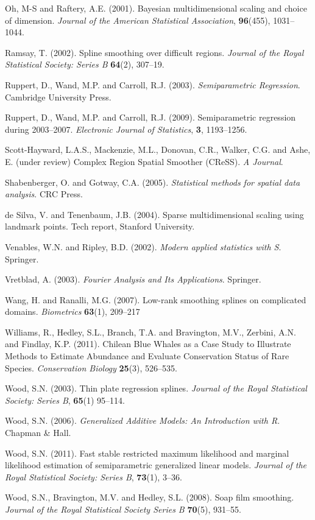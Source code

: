 \documentclass[useAMS, referee]{biom}
\begin{document}
\begin{thebibliography}{99}
\bibitem{} Oh, M-S and Raftery, A.E. (2001). Bayesian multidimensional scaling and choice of dimension. \textit{Journal of the American Statistical Association}, \textbf{96}(455), 1031--1044.

\bibitem{} Ramsay, T. (2002). Spline smoothing over difficult regions. \textit{Journal of the Royal Statistical Society: Series B} \textbf{64}(2), 307--19.

\bibitem{} Ruppert, D., Wand, M.P. and Carroll, R.J. (2003). \textit{Semiparametric Regression}. Cambridge University Press.

\bibitem{} Ruppert, D., Wand, M.P. and Carroll, R.J. (2009). Semiparametric regression during 2003--2007. \textit{Electronic Journal of Statistics}, \textbf{3}, 1193--1256.

\bibitem{} Scott-Hayward, L.A.S., Mackenzie, M.L., Donovan, C.R., Walker, C.G. and Ashe, E. (under review) Complex Region Spatial Smoother (CReSS). \textit{A Journal}.

\bibitem{} Shabenberger, O. and Gotway, C.A. (2005). \textit{Statistical methods for spatial data analysis}. CRC Press.

\bibitem{} de Silva, V. and Tenenbaum, J.B. (2004). Sparse multidimensional scaling using landmark points. Tech report, Stanford University.

\bibitem{} Venables, W.N. and Ripley, B.D. (2002). \textit{Modern applied statistics with S}. Springer.

\bibitem{} Vretblad, A. (2003). \textit{Fourier Analysis and Its Applications}. Springer.

\bibitem{} Wang, H. and Ranalli, M.G. (2007). Low-rank smoothing splines on complicated domains. \textit{Biometrics} \textbf{63}(1), 209--217

\bibitem{} Williams, R., Hedley, S.L., Branch, T.A. and Bravington, M.V., Zerbini, A.N. and Findlay, K.P. (2011). Chilean Blue Whales as a Case Study to Illustrate Methods to Estimate Abundance and Evaluate Conservation Status of Rare Species. \textit{Conservation Biology} \textbf{25}(3), 526--535.

\bibitem{} Wood, S.N. (2003). Thin plate regression splines. \textit{Journal of the Royal Statistical Society: Series B}, \textbf{65}(1) 95--114.

\bibitem{} Wood, S.N. (2006). \textit{Generalized Additive Models: An Introduction with R}. Chapman \& Hall.

\bibitem{} Wood, S.N. (2011). Fast stable restricted maximum likelihood and marginal likelihood estimation of semiparametric generalized linear models. \textit{Journal of the Royal Statistical Society: Series B}, \textbf{73}(1), 3--36.

\bibitem{} Wood, S.N., Bravington, M.V. and Hedley, S.L. (2008). Soap film smoothing. \textit{Journal of the Royal Statistical Society Series B} \textbf{70}(5), 931--55.

\end{thebibliography}


\label{lastpage}
\end{document}
